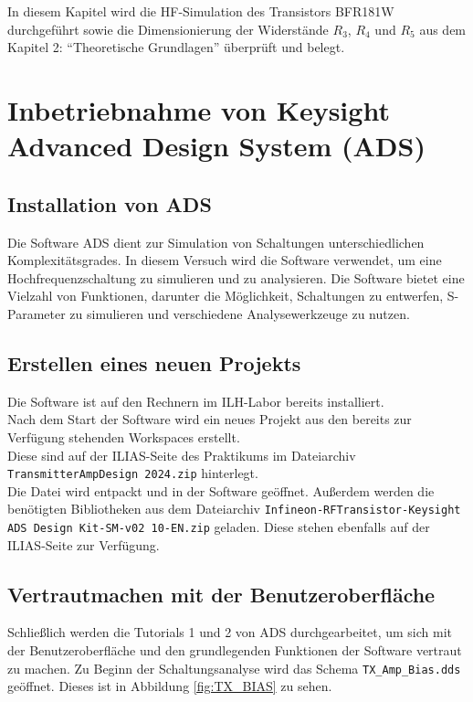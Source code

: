 In diesem Kapitel wird die \ac{HF}-Simulation des Transistors BFR181W durchgeführt sowie die Dimensionierung der Widerstände $R_3$, $R_4$ und $R_5$ aus dem Kapitel 2: \enquote{Theoretische Grundlagen} überprüft und belegt.

\section{Inbetriebnahme von Keysight Advanced Design System (ADS)}
\subsection{Installation von ADS}
Die Software \ac{ADS} dient zur Simulation von Schaltungen unterschiedlichen Komplexitätsgrades. 
In diesem Versuch wird die Software verwendet, um eine Hochfrequenzschaltung zu simulieren und zu analysieren. 
Die Software bietet eine Vielzahl von Funktionen, darunter die Möglichkeit, Schaltungen zu entwerfen, S-Parameter zu simulieren und verschiedene Analysewerkzeuge zu nutzen.

\subsection{Erstellen eines neuen Projekts}
Die Software ist auf den Rechnern im ILH-Labor bereits installiert.\\
Nach dem Start der Software wird ein neues Projekt aus den bereits zur Verfügung stehenden Workspaces erstellt.\\
Diese sind auf der ILIAS-Seite des Praktikums im Dateiarchiv \texttt{TransmitterAmpDesign 2024.zip} hinterlegt.\\
Die Datei wird entpackt und in der Software geöffnet. Außerdem werden die benötigten Bibliotheken aus dem Dateiarchiv \texttt{Infineon-RFTransistor-Keysight ADS Design Kit-SM-v02 10-EN.zip} geladen. Diese stehen ebenfalls auf der ILIAS-Seite zur Verfügung.

\subsection{Vertrautmachen mit der Benutzeroberfläche}
Schließlich werden die Tutorials 1 und 2 von \ac{ADS} durchgearbeitet, um sich mit der Benutzeroberfläche und den grundlegenden Funktionen der Software vertraut zu machen.
Zu Beginn der Schaltungsanalyse wird das Schema \texttt{TX\_Amp\_Bias.dds} geöffnet. Dieses ist in Abbildung \ref{fig:TX_BIAS} zu sehen.

